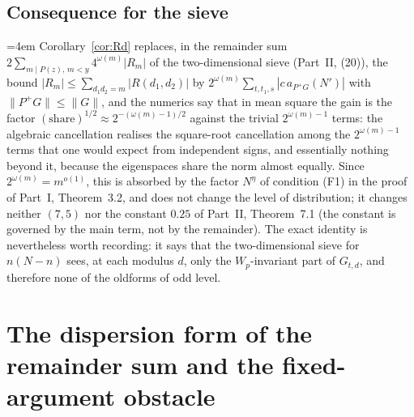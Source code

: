 \documentclass[11pt]{amsart}
\theoremstyle{remark}
\begin{document}
\subsection{Consequence for the sieve}
{\emergencystretch=4em
Corollary~\ref{cor:Rd} replaces, in the remainder sum $2\sum_{m\mid P(z),\,m<y}4^{\omega(m)}|R_m|$ of the two-dimensional sieve (Part~II, (20)), the bound $|R_m|\le\sum_{d_1d_2=m}|R(d_1,d_2)|$ by $2^{\omega(m)}\sum_{t,t_1,s}|c\,a_{P^+G}(N')|$ with $\|P^+G\|\le\|G\|$, and the numerics say that in mean square the gain is the factor $(\text{share})^{1/2}\approx2^{-(\omega(m)-1)/2}$ against the trivial $2^{\omega(m)-1}$ terms: the algebraic cancellation realises the square-root cancellation among the $2^{\omega(m)-1}$ terms that one would expect from independent signs, and essentially nothing beyond it, because the eigenspaces share the norm almost equally. Since $2^{\omega(m)}=m^{o(1)}$, this is absorbed by the factor $N^\eta$ of condition (F1) in the proof of Part~I, Theorem~3.2, and does not change the level of distribution; it changes neither $(7,5)$ nor the constant $0.25$ of Part~II, Theorem~7.1 (the constant is governed by the main term, not by the remainder). The exact identity is nevertheless worth recording: it says that the two-dimensional sieve for $n(N-n)$ sees, at each modulus $d$, only the $W_p$-invariant part of $G_{t,d}$, and therefore none of the oldforms of odd level.
\par}

\section{The dispersion form of the remainder sum and the fixed-argument obstacle}\label{sec:dispersion}
\end{document}

